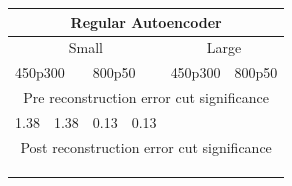 \begin{table}[]
    \centering
    \begin{tabular}{|llllllll|}
    \hline
    \multicolumn{8}{|c|}{Regular Autoencoder}                                                                                                                                    \\ \hline
    \multicolumn{4}{|c|}{Small}                                                                    & \multicolumn{4}{c|}{Large}                                                  \\ \hline
    \multicolumn{2}{|l|}{450p300}                  & \multicolumn{2}{l|}{800p50}                   & \multicolumn{2}{l|}{450p300}                  & \multicolumn{2}{l|}{800p50} \\ \hline
    \multicolumn{8}{|c|}{Pre reconstruction error cut significance}                                                                                                                           \\ \hline
    \multicolumn{1}{|l|}{1.38} & \multicolumn{1}{l|}{1.38} & \multicolumn{1}{l|}{0.13} & \multicolumn{1}{l|}{0.13} & \multicolumn{1}{l|}{} & \multicolumn{1}{l|}{} & \multicolumn{1}{l|}{}   &   \\ \hline
    \multicolumn{8}{|c|}{Post reconstruction error  cut significance}                                                                                                                         \\ \hline
    \multicolumn{1}{|l|}{} & \multicolumn{1}{l|}{} & \multicolumn{1}{l|}{} & \multicolumn{1}{l|}{} & \multicolumn{1}{l|}{} & \multicolumn{1}{l|}{} & \multicolumn{1}{l|}{}   &   \\ \hline
    \multicolumn{1}{|l|}{} & \multicolumn{1}{l|}{} & \multicolumn{1}{l|}{} & \multicolumn{1}{l|}{} & \multicolumn{1}{l|}{} & \multicolumn{1}{l|}{} & \multicolumn{1}{l|}{}   &   \\ \hline
    \multicolumn{1}{|l|}{} & \multicolumn{1}{l|}{} & \multicolumn{1}{l|}{} & \multicolumn{1}{l|}{} & \multicolumn{1}{l|}{} & \multicolumn{1}{l|}{} & \multicolumn{1}{l|}{}   &   \\ \hline
    \end{tabular}
\end{table}

